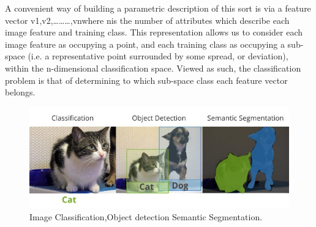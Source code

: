 \documentclass{article}
\begin{document}
A convenient way of building a parametric description of this sort is via a feature vector ​v1,v2,………,vn​where ​n​is the number of attributes which describe each image feature and training class. This representation allows us to consider each image feature as occupying a point, and each training class as occupying a sub-space (i.e. a representative point surrounded by some spread, or deviation), within the n-dimensional classification space. Viewed as such, the classification problem is that of determining to which sub-space class each feature vector belongs.
\begin{figure}[H]
  \centering
  \includegraphics[width=0.7\linewidth]{images/classification_detection_segmentaion_comparisons.jpeg}
   \caption{Image Classification,Object detection Semantic Segmentation.}
\end{figure}
\end{document}
